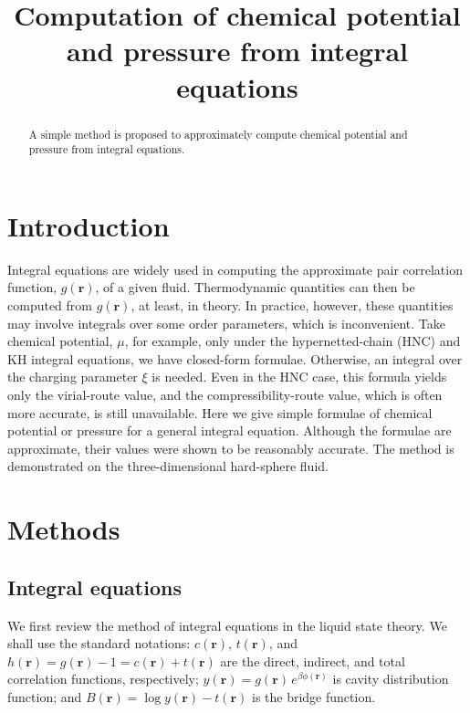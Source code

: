 \documentclass[aip,jcp,reprint,superscriptaddress]{revtex4-1}
\newcommand{\vct}[1]{\mathbf{#1}}
\providecommand{\vr}{} %
\renewcommand{\vr}{\vct{r}}
\begin{document}
\title{Computation of chemical potential and pressure from integral equations}

\begin{abstract}
  A simple method is proposed to approximately compute chemical potential and pressure
  from integral equations.
\end{abstract}
\maketitle



\section{Introduction}

Integral equations are widely used in computing
the approximate pair correlation function, $g(\vr)$, of a given fluid.
%
Thermodynamic quantities can then be computed from $g(\vr)$,
at least, in theory.
%
In practice, however, these quantities may involve integrals
over some order parameters, which is inconvenient.
%
Take chemical potential, $\mu$, for example,
only under the hypernetted-chain (HNC) and KH integral equations,
we have closed-form formulae.
%
Otherwise, an integral over the charging parameter $\xi$ is needed.
%
Even in the HNC case, this formula yields only the virial-route value,
and the compressibility-route value, which is often more accurate,
is still unavailable.
%
Here we give simple formulae
of chemical potential or pressure for a general integral equation.
%
Although the formulae are approximate,
their values were shown to be reasonably accurate.
%
The method is demonstrated on the three-dimensional hard-sphere fluid.



\section{Methods}


\subsection{Integral equations}

We first review the method of integral equations in the liquid state theory.
%
We shall use the standard notations:
$c(\vr)$, $t(\vr)$, and $h(\vr) = g(\vr) - 1 = c(\vr) + t(\vr)$
are the direct, indirect, and total correlation functions, respectively;
$y(\vr) = g(\vr) \, e^{\beta \phi(\vr)}$ is cavity distribution function;
and $B(\vr) = \log y(\vr) - t(\vr)$ is the bridge function.
\end{document}
